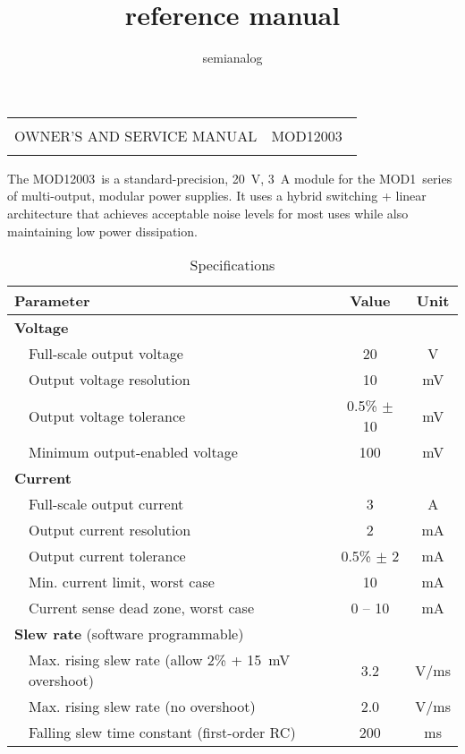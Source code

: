 \documentclass[letterpaper,twocolumn,10pt,openany,oneside,final,fleqn]{memoir}
\title{\Model reference manual}
\author{semianalog}
\newcommand{\Model}{MOD12003\ }
\newcommand{\Series}{MOD1\ }
\begin{document}
\frontmatter

\onecolumn
\begin{titlingpage}
\begin{tabularx}{\textwidth}{Xr}
\hline
\\
{\LARGE OWNER'S AND SERVICE MANUAL} &
\Model \\
\\
\hline
\end{tabularx}
\vfill
\begin{center}
    The \Model is a standard-precision, \SI{20}{V}, \SI{3}{A} module for the
    \Series series of multi-output, modular power supplies. It uses a hybrid
    switching + linear architecture that achieves acceptable noise levels for
    most uses while also maintaining low power dissipation.
\end{center}
\vfill
\begin{table}[h]
\centering
\caption{Specifications}
\begin{tabular}{p{2mm}lcc}
    \toprule
    \multicolumn{2}{l}{\textbf{Parameter}} & \textbf{Value} & \textbf{Unit} \\ \midrule
    \multicolumn{2}{l}{\textbf{Voltage}} & & \\ \midrule
    & Full-scale output voltage & 20 & V \\
    & Output voltage resolution & 10 & mV \\
    & Output voltage tolerance  & 0.5\% $\pm$ 10 & mV \\
    & Minimum output-enabled voltage & 100 & mV \\
    \midrule
    \multicolumn{2}{l}{\textbf{Current}} & & \\ \midrule
    & Full-scale output current & 3 & A  \\
    & Output current resolution & 2 & mA \\
    & Output current tolerance  & 0.5\% $\pm$ 2 & mA \\
    & Min. current limit, worst case & 10 & mA \\
    & Current sense dead zone, worst case   & 0 -- 10 & mA \\
    \midrule
    \multicolumn{2}{l}{\textbf{Slew rate} (software programmable)} & & \\ \midrule
    & Max. rising slew rate (allow 2\% + \SI{15}{mV} overshoot) & 3.2 & V/ms \\
    & Max. rising slew rate (no overshoot) & 2.0 & V/ms \\
    & Falling slew time constant (first-order RC) & 200 & ms \\

\end{tabular}
\end{table}
\end{titlingpage}
\end{document}
